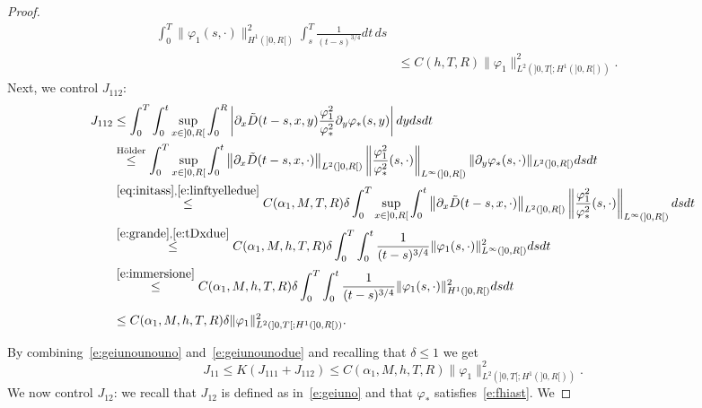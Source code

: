 \documentclass[11pt,leqno]{amsart}
\numberwithin{equation}{section}
\begin{document}
\begin{proof}
\begin{equation}
\begin{split}
  \int_0^T \| {\varphi}_1(s, \cdot)  \|^2_{H^1(]0, R[)} 
  \int_s^T  \frac{1}{(t-s)^{3/4}} dt \, ds  \\
  & \leq  C(h, T, R) 
  \| {\varphi}_1 \|^2_{L^2 (]0, T[; H^1 (]0, R[))}. \phantom{\int}
 \end{split}
\end{equation}
Next, we control $J_{112}$:
\begin{equation}
  \label{e:geiunounodue}
  \begin{split}
    J_{112} & \leq \int_0^T \int_0^t \sup_{x \in ]0, R[} \int_0^R
    \left| \partial_{x} \tilde D(t-s, x, y)
      \frac{{\varphi}_1^2}{{\varphi}_\ast^2} \partial_y {\varphi}_\ast (s, y) \right|
    dy ds  dt
    \\
    & \stackrel{\text{H\"older}}{\leq} \int_0^T \sup_{x \in ]0, R[}
    \int_0^t \left\| \partial_{x} \tilde D(t-s, x, \cdot)
    \right\|_{L^2(]0, R[)} \left\| \frac{{\varphi}_1^2}{{\varphi}_\ast^2} (s,
      \cdot) \right\|_{L^\infty(]0, R[)} \| \partial_y {\varphi}_\ast (s,
    \cdot) \|_{L^2 (]0, R[)} ds dt 
    \\
    &
    \stackrel{\eqref{eq:initass},\eqref{e:linftyelledue}}{\leq} C(\alpha_1,M,
    T, R) \delta \int_0^T \sup_{x \in ]0, R[} \int_0^t
    \left\| \partial_{x} \tilde D(t-s, x, \cdot) \right\|_{L^2(]0,
      R[)} \left\| \frac{{\varphi}_1^2}{{\varphi}_\ast^2} (s, \cdot)
    \right\|_{L^\infty(]0, R[)} dsdt
    \\
    &
    \stackrel{\eqref{e:grande},\eqref{e:tDxdue}}{\leq} C(\alpha_1, M, h, T, R)
    \delta \int_0^T \int_0^t \frac{1}{(t-s)^{3/4}} \| {\varphi}_1 (s,
    \cdot) \|_{L^\infty(]0, R[)}^2 ds dt
    \\
    &
    \stackrel{\eqref{e:immersione}}{\leq} C(\alpha_1, M, h, T, R) \delta
    \int_0^T \int_0^t \frac{1}{(t-s)^{3/4}} \| {\varphi}_1 (s, \cdot)
    \|_{H^1(]0, R[)}^2 ds
    dt  
    \\
    & \leq C(\alpha_1, M, h, T, R) \delta \| {\varphi}_1 \|^2_{L^2 (]0, T[; H^1 (]0,
      R[))}. \phantom{\int}
  \end{split}
\end{equation}
By combining~\eqref{e:geiunounouno} and~\eqref{e:geiunounodue} and recalling that $\delta \leq 1$ we get 
\begin{equation}
\label{e:geiunounofinal}
   J_{11} \le K \left(J_{111} + J_{112}\right)  \leq 
   C(\alpha_1, M, h, T, R)
      \| {\varphi}_1 \|^2_{L^2 (]0, T[; H^1 (]0, R[))}.
\end{equation}
We now control $J_{12}$: we recall that $J_{12}$ is defined as in~\eqref{e:geiuno} and that ${\varphi}_\ast$ satisfies~\eqref{e:fhiast}. We 

\end{proof}
\end{document}

